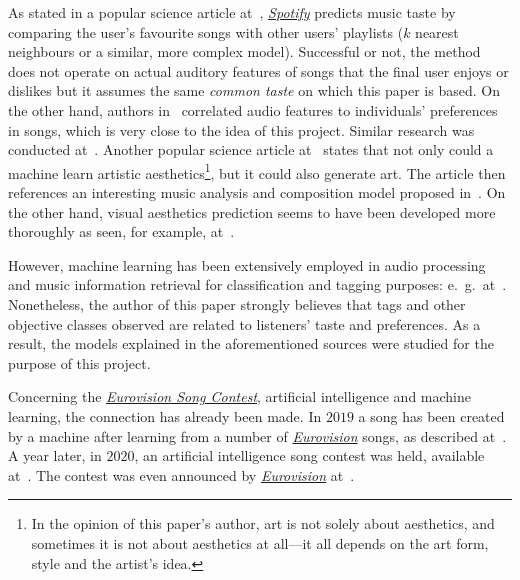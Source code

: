 \documentclass[conference, a4paper, 12pt]{IEEEtran}
\begin{document}
    As stated in a popular science article at~\cite{bib:Fagella2019}, \href{http://spotify.com/}{\emph{Spotify}} predicts music taste by comparing the user's favourite songs with other users' playlists ($ k $ nearest neighbours or a similar, more complex model). Successful or not, the method does not operate on actual auditory features of songs that the final user enjoys or dislikes but it assumes the same \emph{common taste} on which this paper is based. On the other hand, authors in~\cite{bib:Oord2013} correlated audio features to individuals' preferences in songs, which is very close to the idea of this project. Similar research was conducted at~\cite{bib:McFee2012}. Another popular science article at~\cite{bib:Roza2019} states that not only could a machine learn artistic aesthetics\footnote{In the opinion of this paper's author, art is not solely about aesthetics, and sometimes it is not about aesthetics at all---it all depends on the art form, style and the artist's idea.}, but it could also generate art. The article then references an interesting music analysis and composition model proposed in~\cite{bib:Manaris2007}. On the other hand, visual aesthetics prediction seems to have been developed more thoroughly as seen, for example, at~\cite{bib:Lu2014,bib:Malu2017}.

    \par

    However, machine learning has been extensively employed in audio processing and music information retrieval for classification and tagging purposes: e.~g.\ at~\cite{bib:Hoffman2009,bib:Lee2009,bib:Hamel2010,bib:Dielman2011,bib:Pons2018,bib:Pons2019}. Nonetheless, the author of this paper strongly believes that tags and other objective classes observed are related to listeners' taste and preferences. As a result, the models explained in the aforementioned sources were studied for the purpose of this project.

    \par

    Concerning the \href{http://eurovision.tv/}{\emph{Eurovision Song Contest}}, artificial intelligence and machine learning, the connection has already been made. In $ 2019 $ a song has been created by a machine after learning from a number of \href{http://eurovision.tv/}{\emph{Eurovision}} songs, as described at~\cite{bib:Shapira2019,bib:Drake2019,bib:Ackerman2019}. A year later, in $ 2020 $, an artificial intelligence song contest was held, available at~\cite{bib:VPROAI2020,bib:VPROAIWin2020}. The contest was even announced by \href{http://eurovision.tv/}{\emph{Eurovision}} at~\cite{bib:ESCAI2020}.
\end{document}
